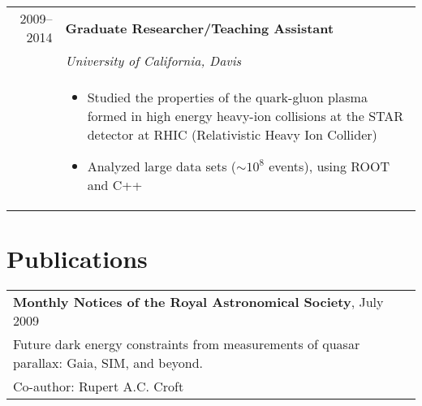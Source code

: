 \documentclass[letterpaper,10pt]{article}
\newif\ifpubl
\begin{document}
\begin{tabular}{rp{13cm}}
	2009--2014 & \textbf{Graduate Researcher/Teaching Assistant} \\
 		& \emph{University of California, Davis}\\
		& 
			\begin{itemize}
			\item Studied the properties of the quark-gluon plasma formed in high energy heavy-ion collisions at the STAR detector at RHIC (Relativistic Heavy Ion Collider)
			\item Analyzed large data sets ($\sim10^8$ events), using ROOT and C++
			\end{itemize} 
\end{tabular}

\ifpubl
	\section{Publications}
	\begin{tabular}{l}
	\textbf{Monthly Notices of the Royal Astronomical Society}, July 2009 \\
	Future dark energy constraints from measurements of quasar parallax: Gaia, SIM, and beyond. \\
	Co-author: Rupert A.C. Croft
	\end{tabular}
\end{document}
